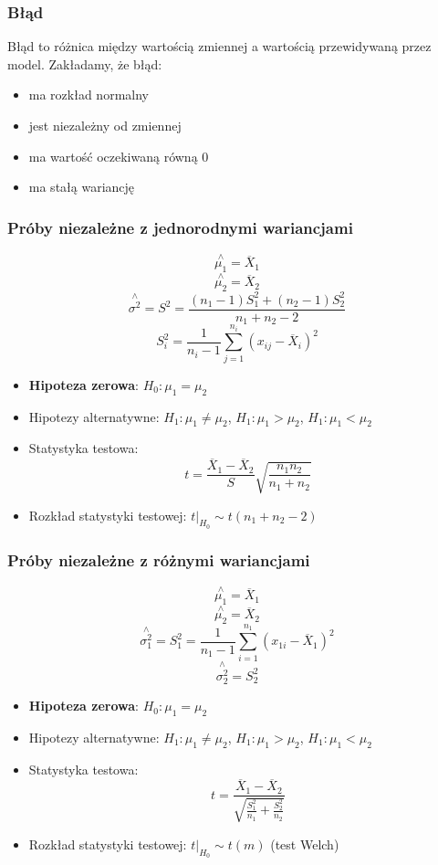 \documentclass{../notatki}
\begin{document}
\subsubsection{Błąd}

Błąd to różnica między wartością zmiennej a wartością przewidywaną przez
model. Zakładamy, że błąd:
\begin{itemize}
  \item ma rozkład normalny
  \item jest niezależny od zmiennej
  \item ma wartość oczekiwaną równą 0
  \item ma stałą wariancję
\end{itemize}

\subsubsection{Próby niezależne z jednorodnymi wariancjami}

$$
\stackrel{\wedge}{\mu_1} = \overline{X}_1
$$
$$
\stackrel{\wedge}{\mu_2} = \overline{X}_2
$$
$$
\stackrel{\wedge}{\sigma^2} = S^2 = \frac{(n_1 - 1)S_1^2 + (n_2 -
1)S_2^2}{n_1 + n_2 - 2}
$$
$$
S_i^2 = \frac{1}{n_i - 1} \sum_{j=1}^{n_i} (x_{ij} - \overline{X}_i)^2
$$

\begin{itemize}
  \item \textbf{Hipoteza zerowa}: $H_0: \mu_1 = \mu_2$
  \item Hipotezy alternatywne: $H_1: \mu_1 \neq \mu_2$, $H_1: \mu_1 >
    \mu_2$, $H_1: \mu_1 < \mu_2$
  \item Statystyka testowa:
    $$
    t = \frac{\overline{X}_1 - \overline{X}_2}{S}
    \sqrt{\frac{n_1n_2}{n_1 + n_2}}
    $$
  \item Rozkład statystyki testowej: $t|_{H_0} \sim t(n_1 + n_2 - 2)$
\end{itemize}

\subsubsection{Próby niezależne z różnymi wariancjami}

$$
\stackrel{\wedge}{\mu_1} = \overline{X}_1
$$
$$
\stackrel{\wedge}{\mu_2} = \overline{X}_2
$$
$$
\stackrel{\wedge}{\sigma_1^2} = S_1^2 = \frac{1}{n_1 - 1}
\sum_{i=1}^{n_1} (x_{1i} - \overline{X}_1)^2
$$
$$
\stackrel{\wedge}{\sigma_2^2} = S_2^2
$$

\begin{itemize}
  \item \textbf{Hipoteza zerowa}: $H_0: \mu_1 = \mu_2$
  \item Hipotezy alternatywne: $H_1: \mu_1 \neq \mu_2$, $H_1: \mu_1 >
    \mu_2$, $H_1: \mu_1 < \mu_2$
  \item Statystyka testowa:
    $$
    t = \frac{\overline{X}_1 - \overline{X}_2}{\sqrt{\frac{S_1^2}{n_1} +
    \frac{S_2^2}{n_2}}}
    $$
  \item Rozkład statystyki testowej: $t|_{H_0} \sim t(m)$ (test Welch)
\end{itemize}
\end{document}
